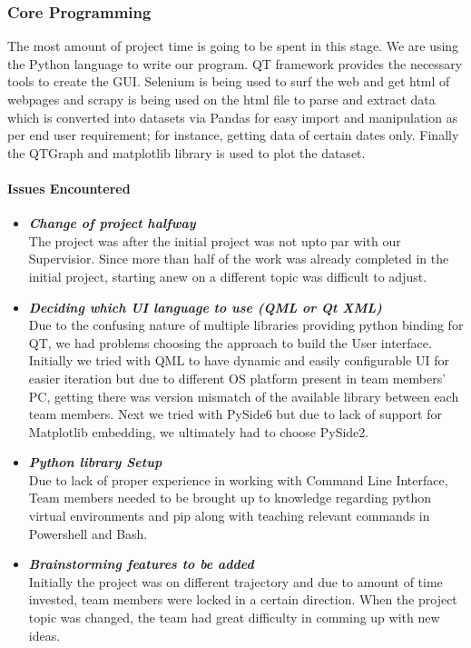 \documentclass[12pt]{article}
\begin{document}
\subsubsection{Core Programming}
The most amount of project time is going to be spent in this stage. We are using the Python language to write our program. QT framework provides the necessary 
tools to create the GUI. Selenium is being used to surf the web and get html of webpages and scrapy is being used on the html file to parse and extract data 
which is converted into datasets via Pandas for easy import and manipulation as per end user requirement; for instance, getting data of certain dates only. 
Finally the QTGraph and matplotlib library is used to plot the dataset.
\paragraph{Issues Encountered}
\begin{itemize}
    \item \textit{\textbf{Change of project halfway}}\\
        The project was after the initial project was not upto par with our Supervisior. Since more than half of the work was already completed in the initial project,
        starting anew on a different topic was difficult to adjust. 
    \item \textit{\textbf{Deciding which UI language to use (QML or Qt XML)}}\\
        Due to the confusing nature of multiple libraries providing python binding for QT, we had problems choosing the approach to build the User interface. Initially we tried with
        QML to have dynamic and easily configurable UI for easier iteration but due to different OS platform present in team members' PC, getting there was version mismatch of the available 
        library between each team members. Next we tried with PySide6 but due to lack of support for Matplotlib embedding, we ultimately had to choose PySide2. 
    \item \textit{\textbf{Python library Setup}}\\
        Due to lack of proper experience in working with Command Line Interface, Team members needed to be brought up to knowledge regarding python virtual environments and pip along with teaching relevant
        commands in Powershell and Bash.
    \item \textit{\textbf{Brainstorming features to be added}}\\
        Initially the project was on different trajectory and due to amount of time invested, team members were locked in a certain direction. When the project topic was changed, the team had great difficulty in
        comming up with new ideas.
\end{itemize}
\end{document}
